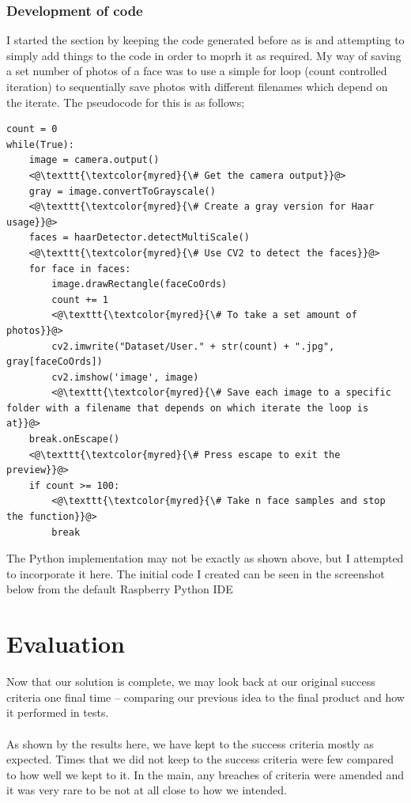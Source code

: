 \documentclass[9pt]{article}
\begin{document}
\subsubsection{Development of code}
I started the section by keeping the code generated before as is and attempting to simply add things to the code in order to moprh it as required. My way of saving a set number of photos of a face was to use a simple for loop (count controlled iteration) to sequentially save photos with different filenames which depend on the iterate. The pseudocode for this is as follows;
\begin{lstlisting}
count = 0
while(True):
	image = camera.output()
	<@\texttt{\textcolor{myred}{\# Get the camera output}}@> 
	gray = image.convertToGrayscale()
	<@\texttt{\textcolor{myred}{\# Create a gray version for Haar usage}}@> 
	faces = haarDetector.detectMultiScale()
	<@\texttt{\textcolor{myred}{\# Use CV2 to detect the faces}}@> 
	for face in faces:
		image.drawRectangle(faceCoOrds) 
		count += 1
		<@\texttt{\textcolor{myred}{\# To take a set amount of photos}}@> 
		cv2.imwrite("Dataset/User." + str(count) + ".jpg", gray[faceCoOrds])
		cv2.imshow('image', image)
		<@\texttt{\textcolor{myred}{\# Save each image to a specific folder with a filename that depends on which iterate the loop is at}}@> 
	break.onEscape() 
	<@\texttt{\textcolor{myred}{\# Press escape to exit the preview}}@> 
	if count >= 100: 
		<@\texttt{\textcolor{myred}{\# Take n face samples and stop the function}}@> 
		break
\end{lstlisting}
The Python implementation may not be exactly as shown above, but I attempted to incorporate it here. The initial code I created can be seen in the screenshot below from the default Raspberry Python IDE 






\newpage
\section{Evaluation}
Now that our solution is complete, we may look back at our original success criteria one final time -- comparing our previous idea to the final product and how it performed in tests.\\\\
As shown by the results here, we have kept to the success criteria mostly as expected. Times that we did not keep to the success criteria were few compared to how well we kept to it. In the main, any breaches of criteria were amended and it was very rare to be not at all close to how we intended.
\end{document}
